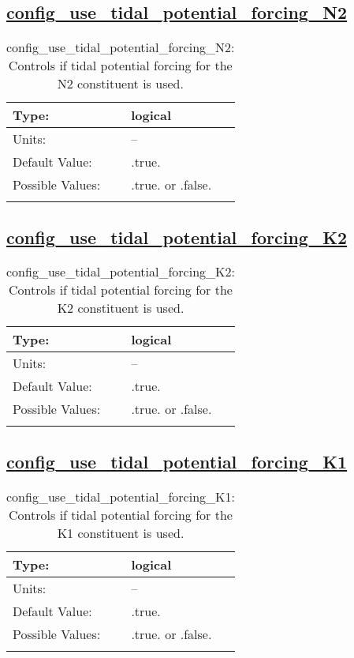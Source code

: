 \subsection[config\_use\_tidal\_potential\_forcing\_N2]{\hyperref[sec:nm_tab_tidal_potential_forcing]{config\_use\_tidal\_potential\_forcing\_N2}}
\label{subsec:nm_sec_config_use_tidal_potential_forcing_N2}
\begin{center}
\begin{longtable}{| p{2.0in} || p{4.0in} |}
    \hline
    Type: & logical \\
    \hline
    Units: & -- \\
    \hline
    Default Value: & .true. \\
    \hline
    Possible Values: & .true. or .false. \\
    \hline
    \caption{config\_use\_tidal\_potential\_forcing\_N2: Controls if tidal potential forcing for the N2 constituent is used.}
\end{longtable}
\end{center}
\subsection[config\_use\_tidal\_potential\_forcing\_K2]{\hyperref[sec:nm_tab_tidal_potential_forcing]{config\_use\_tidal\_potential\_forcing\_K2}}
\label{subsec:nm_sec_config_use_tidal_potential_forcing_K2}
\begin{center}
\begin{longtable}{| p{2.0in} || p{4.0in} |}
    \hline
    Type: & logical \\
    \hline
    Units: & -- \\
    \hline
    Default Value: & .true. \\
    \hline
    Possible Values: & .true. or .false. \\
    \hline
    \caption{config\_use\_tidal\_potential\_forcing\_K2: Controls if tidal potential forcing for the K2 constituent is used.}
\end{longtable}
\end{center}
\subsection[config\_use\_tidal\_potential\_forcing\_K1]{\hyperref[sec:nm_tab_tidal_potential_forcing]{config\_use\_tidal\_potential\_forcing\_K1}}
\label{subsec:nm_sec_config_use_tidal_potential_forcing_K1}
\begin{center}
\begin{longtable}{| p{2.0in} || p{4.0in} |}
    \hline
    Type: & logical \\
    \hline
    Units: & -- \\
    \hline
    Default Value: & .true. \\
    \hline
    Possible Values: & .true. or .false. \\
    \hline
    \caption{config\_use\_tidal\_potential\_forcing\_K1: Controls if tidal potential forcing for the K1 constituent is used.}
\end{longtable}
\end{center}
